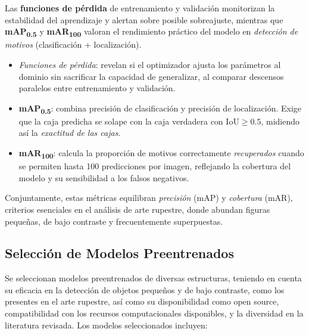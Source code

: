 Las \textbf{funciones de pérdida} de entrenamiento y validación monitorizan la estabilidad del aprendizaje y alertan sobre posible sobreajuste, mientras que \textbf{mAP\textsubscript{0.5}} y \textbf{mAR\textsubscript{100}} valoran el rendimiento práctico del modelo en \emph{detección de motivos} (clasificación + localización).

\begin{itemize}
    \item \emph{Funciones de pérdida}: revelan si el optimizador ajusta los parámetros al dominio sin sacrificar la capacidad de generalizar, al comparar descensos paralelos entre entrenamiento y validación.
    \item \textbf{mAP\textsubscript{0.5}}: combina precisión de clasificación y precisión de localización.
    Exige que la caja predicha se solape con la caja verdadera con $\text{IoU}\ge 0.5$, midiendo así la \emph{exactitud de las cajas}.
    \item \textbf{mAR\textsubscript{100}}: calcula la proporción de motivos correctamente \emph{recuperados} cuando se permiten hasta 100 predicciones por imagen, reflejando la cobertura del modelo y su sensibilidad a los falsos negativos.
\end{itemize}

Conjuntamente, estas métricas equilibran \emph{precisión} (mAP) y \emph{cobertura} (mAR), criterios esenciales en el análisis de arte rupestre, donde abundan figuras pequeñas, de bajo contraste y frecuentemente superpuestas.


\subsection{Selección de Modelos Preentrenados}
Se seleccionan modelos preentrenados de diversas estructuras, teniendo en cuenta su eficacia en la detección de objetos pequeños y de bajo contraste, como los presentes en el arte rupestre, así como su disponibilidad como open source, compatibilidad con los recursos computacionales disponibles, y la diversidad en la literatura revisada.
Los modelos seleccionados incluyen:

